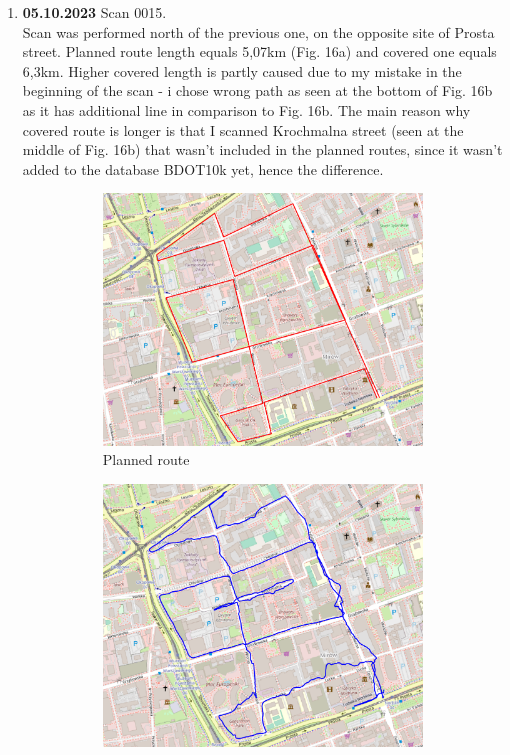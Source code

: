 \documentclass[a4paper,12pt]{book}
\begin{document}
\begin{enumerate}
	\item \textbf{05.10.2023} Scan 0015. \\
	Scan was performed north of the previous one, on the opposite site of Prosta street. Planned route length equals 5,07km (Fig. 16a) and covered one equals 6,3km. Higher covered length is partly caused due to my mistake in the beginning of the scan - i chose wrong path as seen at the bottom of Fig. 16b as it has additional line in comparison to Fig. 16b. The main reason why covered route is longer is that I scanned Krochmalna street (seen at the middle of Fig. 16b) that wasn't included in the planned routes, since it wasn't added to the database BDOT10k yet, hence the difference. 
	\begin{figure}[H]
		\centering
		\begin{subfigure}{.85\textwidth}
			\centering
			\includegraphics[width=1\linewidth]{route_p15}
			\caption{Planned route}
			\label{fig:a15}
		\end{subfigure}%
		\linebreak
		\begin{subfigure}{.85\textwidth}
			\centering
			\includegraphics[width=1\linewidth]{route_c15}

\end{subfigure}
\end{figure}
\end{enumerate}
\end{document}
